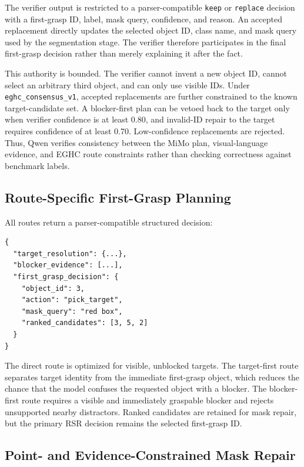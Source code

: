 The verifier output is restricted to a parser-compatible \texttt{keep} or \texttt{replace} decision with a first-grasp ID, label, mask query, confidence, and reason. An accepted replacement directly updates the selected object ID, class name, and mask query used by the segmentation stage. The verifier therefore participates in the final first-grasp decision rather than merely explaining it after the fact.

This authority is bounded. The verifier cannot invent a new object ID, cannot select an arbitrary third object, and can only use visible IDs. Under \texttt{eghc\_consensus\_v1}, accepted replacements are further constrained to the known target-candidate set. A blocker-first plan can be vetoed back to the target only when verifier confidence is at least 0.80, and invalid-ID repair to the target requires confidence of at least 0.70. Low-confidence replacements are rejected. Thus, Qwen verifies consistency between the MiMo plan, visual-language evidence, and EGHC route constraints rather than checking correctness against benchmark labels.

\subsection{Route-Specific First-Grasp Planning}

All routes return a parser-compatible structured decision:
\begin{verbatim}
{
  "target_resolution": {...},
  "blocker_evidence": [...],
  "first_grasp_decision": {
    "object_id": 3,
    "action": "pick_target",
    "mask_query": "red box",
    "ranked_candidates": [3, 5, 2]
  }
}
\end{verbatim}

The direct route is optimized for visible, unblocked targets. The target-first route separates target identity from the immediate first-grasp object, which reduces the chance that the model confuses the requested object with a blocker. The blocker-first route requires a visible and immediately graspable blocker and rejects unsupported nearby distractors. Ranked candidates are retained for mask repair, but the primary RSR decision remains the selected first-grasp ID.

\subsection{Point- and Evidence-Constrained Mask Repair}

